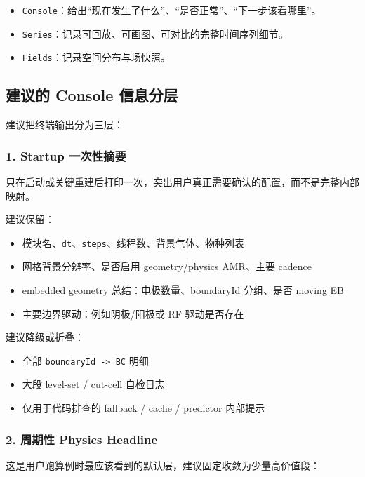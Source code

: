\documentclass[11pt,a4paper]{ctexart}
\newcommand{\code}[1]{\texttt{#1}}
\begin{document}
\begin{itemize}
  \item \code{Console}：给出``现在发生了什么''、``是否正常''、``下一步该看哪里''。
  \item \code{Series}：记录可回放、可画图、可对比的完整时间序列细节。
  \item \code{Fields}：记录空间分布与场快照。
\end{itemize}

\subsection{建议的 Console 信息分层}

建议把终端输出分为三层：

\subsubsection{1. Startup 一次性摘要}

只在启动或关键重建后打印一次，突出用户真正需要确认的配置，而不是完整内部映射。

建议保留：

\begin{itemize}
  \item 模块名、\code{dt}、\code{steps}、线程数、背景气体、物种列表
  \item 网格背景分辨率、是否启用 geometry/physics AMR、主要 cadence
  \item embedded geometry 总结：电极数量、boundaryId 分组、是否 moving EB
  \item 主要边界驱动：例如阴极/阳极或 RF 驱动是否存在
\end{itemize}

建议降级或折叠：

\begin{itemize}
  \item 全部 \code{boundaryId -> BC} 明细
  \item 大段 level-set / cut-cell 自检日志
  \item 仅用于代码排查的 fallback / cache / predictor 内部提示
\end{itemize}

\subsubsection{2. 周期性 Physics Headline}

这是用户跑算例时最应该看到的默认层，建议固定收敛为少量高价值段：
\end{document}

